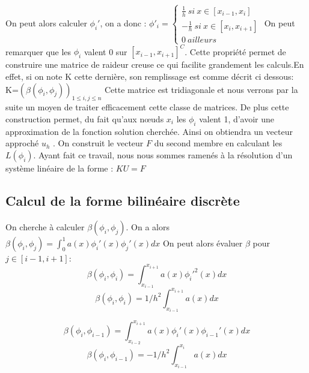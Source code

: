 \documentclass[a4paper,french,10pt]{article}
\begin{document}
On peut alors calculer $\phi_i'$, on a donc :
\newline\newline
 $ \phi'_i= \left\{
\begin{array}{l}
    \frac{1}{h}~si~x \in [x_{i-1},x_i] \\
    -\frac{1}{h}~si~x \in [x_i,x_{i+1}]   \\
    0~ailleurs 
    
\end{array}
\right.$
\newline\newline On peut remarquer que les $\phi_i$ valent 0 sur $[x_{i-1},x_{i+1}]^C$. Cette propriété permet de construire une matrice de raideur creuse ce qui facilite grandement les calculs.En effet, si on note K cette dernière, son remplissage est comme décrit ci dessous:
\newline\newline K=$( \beta(\phi_i,\phi_j))_{1\leq i,j \leq n}$
\newline\newline Cette matrice est tridiagonale et nous verrons par la suite un moyen de traiter efficacement cette classe de matrices. De plus cette construction permet, du fait qu'aux nœuds $x_i$ les $\phi_i$ valent 1, d'avoir une approximation de la fonction solution cherchée. Ainsi on obtiendra un vecteur approché $u_h$ .
\newline On construit le vecteur $F$ du second membre en calculant les $L(\phi_i)$.
\newline Ayant fait ce travail, nous nous sommes ramenés à la résolution d'un système linéaire de la forme : $ KU=F$

\subsection{Calcul de la forme bilinéaire discrète}

On cherche à calculer $ \beta (\phi_i,\phi_j) $. On a alors $ \beta (\phi_i,\phi_j)=\int_{0}^{1}a(x)\phi_i'(x)\phi_j'(x)dx $
On peut alors évaluer $\beta$ pour $j\in[i-1,i+1]$:
\begin{equation*}
	\beta (\phi_i,\phi_i)=\int_{x_{i-1}}^{x_{i+1}}a(x)\phi_i'^2(x)dx
\end{equation*}
\begin{equation}
	\beta (\phi_i,\phi_i)=1/h^2 \int_{x_{i-1}}^{x_{i+1}}a(x)dx
\end{equation}

\begin{equation*}
	\beta (\phi_i,\phi_{i-1})=\int_{x_{i-2}}^{x_{i+1}}a(x)\phi_i'(x)\phi_{i-1}'(x)dx
\end{equation*}
\begin{equation}
	\beta (\phi_i,\phi_{i-1})=-1/h^2\int_{x_{i-1}}^{x_{i}}a(x)dx
\end{equation}
\end{document}
